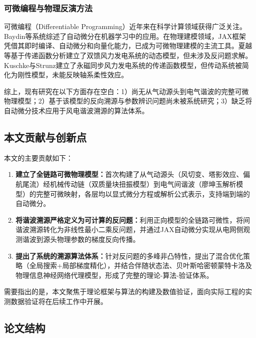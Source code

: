 \documentclass[withoutpreface,bwprint]{cumcmthesis}
\begin{document}
\subsubsection{可微编程与物理反演方法}

可微编程（Differentiable Programming）近年来在科学计算领域获得广泛关注。Baydin等\cite{baydin2018automatic}系统综述了自动微分在机器学习中的应用。在物理建模领域，JAX框架凭借其即时编译、自动微分和向量化能力，已成为可微物理建模的主流工具\cite{jax2023documentation}。夏越等\cite{xia2024modeling}基于传递函数分析建立了双馈风力发电系统的动态模型，但未涉及反问题求解。Kuschke与Strunz\cite{kuschke2014energy}建立了永磁同步风力发电系统的传递函数模型，但传动系统被简化为刚性模型，未能反映轴系柔性效应。

综上，现有研究在以下方面存在空白：1）尚无从气动源头到电气谐波的完整可微物理模型；2）基于该模型的反向溯源与参数辨识问题尚未被系统研究；3）缺乏将自动微分技术应用于风电谐波溯源的算法体系。

\subsection{本文贡献与创新点}

本文的主要贡献如下：

\begin{enumerate}
\item \textbf{建立了全链路可微物理模型：}首次构建了从气动源头（风切变、塔影效应、偏航尾流）经机械传动链（双质量块扭振模型）到电气间谐波（廖坤玉解析模型）的完整可微映射，各层均以显式微分方程或解析公式表示，支持端到端的自动微分。

\item \textbf{将谐波溯源严格定义为可计算的反问题：}利用正向模型的全链路可微性，将间谐波溯源转化为非线性最小二乘反问题，并通过JAX自动微分实现从电网侧观测谐波到源头物理参数的梯度反向传播。

\item \textbf{提出了系统的溯源算法体系：}针对反问题的多峰非凸特性，提出了混合优化策略（全局搜索+局部梯度精化），并结合伴随状态法、贝叶斯哈密顿蒙特卡洛及物理信息神经网络代理模型，形成了完整的理论-算法-验证体系。
\end{enumerate}

需要指出的是，本文聚焦于理论框架与算法的构建及数值验证，面向实际工程的实测数据验证将在后续工作中开展。

\subsection{论文结构}
\end{document}
